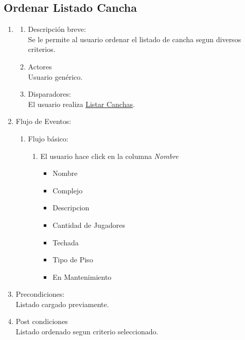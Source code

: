 \documentclass[a4paper,11pt]{article}
\begin{document}
\subsection{Ordenar Listado Cancha}
\begin{enumerate}

    \item
    \begin{enumerate}
    \item Descripción breve: \\
        Se le permite al usuario ordenar el listado de cancha segun diversos criterios.
    \item Actores \\
        Usuario genérico.
    \item Disparadores: \\
        El usuario realiza \underline{Listar Canchas}.
    \end{enumerate}

    \item Flujo de Eventos: 

    \begin{enumerate}

        \item Flujo básico:
        \begin{enumerate}
                    \item El usuario hace click en la columna \emph{Nombre}
			\begin{itemize}
			 \item Nombre
			 \item Complejo
			 \item Descripcion
			 \item Cantidad de Jugadores
			 \item Techada
			 \item Tipo de Piso
			 \item En Mantenimiento
			\end{itemize}
        \end{enumerate}
    \end{enumerate}

    \item Precondiciones: \\
        Listado cargado previamente.

    \item Post condiciones \\
        Listado ordenado segun criterio seleccionado.

\end{enumerate}
\end{document}
